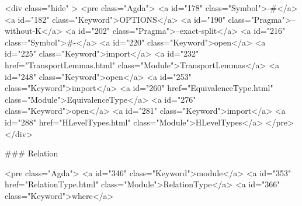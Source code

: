   <div class="hide" >
<pre class="Agda">
<a id="178" class="Symbol">{-#</a> <a id="182" class="Keyword">OPTIONS</a> <a id="190" class="Pragma">--without-K</a> <a id="202" class="Pragma">--exact-split</a> <a id="216" class="Symbol">#-}</a>
<a id="220" class="Keyword">open</a> <a id="225" class="Keyword">import</a> <a id="232" href="TransportLemmas.html" class="Module">TransportLemmas</a>
<a id="248" class="Keyword">open</a> <a id="253" class="Keyword">import</a> <a id="260" href="EquivalenceType.html" class="Module">EquivalenceType</a>
<a id="276" class="Keyword">open</a> <a id="281" class="Keyword">import</a> <a id="288" href="HLevelTypes.html" class="Module">HLevelTypes</a>
</pre>
</div>

### Relation

<pre class="Agda">
<a id="346" class="Keyword">module</a> <a id="353" href="RelationType.html" class="Module">RelationType</a> <a id="366" class="Keyword">where</a>

